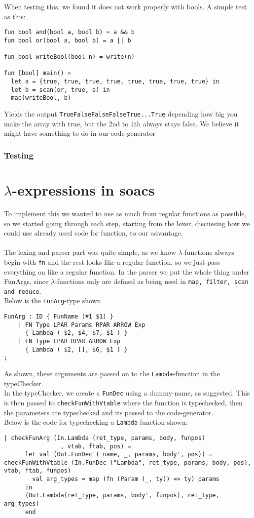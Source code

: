 \documentclass[paper=a4, fontsize=11pt]{scrartcl} %
\numberwithin{equation}{section} %
\numberwithin{figure}{section} %
\numberwithin{table}{section} %
\begin{document}
When testing this, we found it does not work properly with bools. A simple test as this:
\begin{lstlisting}
fun bool and(bool a, bool b) = a && b
fun bool or(bool a, bool b) = a || b

fun bool writeBool(bool n) = write(n)

fun [bool] main() =
  let a = {true, true, true, true, true, true, true, true} in
  let b = scan(or, true, a) in
  map(writeBool, b)
\end{lstlisting}
 Yields the output \verb"TrueFalseFalseFalseTrue...True" depending how big you make the array with true, but the 2nd to 4th always stays false. We believe it might have something to do in our code-generator
\subsubsection{Testing}

\section{$\lambda$-expressions in soacs}

To implement this we wanted to use as much from regular functions as possible, so we started going through each step, starting from the lexer, discussing how we could use already used code for function, to our advantage.\\\\
The lexing and parser part was quite simple, as we know $\lambda$-functions always begin with \verb"fn" and the rest looks like a regular function, so we just pass everything on like a regular function. In the parser we put the whole thing under FunArgs, since $\lambda$-functions only are defined as being used in \verb"map, filter, scan and reduce".\\
Below is the \verb"FunArg"-type shown
\begin{lstlisting}
FunArg : ID { FunName (#1 $1) }
    | FN Type LPAR Params RPAR ARROW Exp
      { Lambda ( $2, $4, $7, $1 ) }
    | FN Type LPAR RPAR ARROW Exp
      { Lambda ( $2, [], $6, $1 ) }
;
\end{lstlisting}

As shown, these arguments are passed on to the \verb"Lambda"-function in the typeChecker.\\
In the typeChecker, we create a \verb"FunDec" using a dummy-name, as suggested. This is then passed to \verb"checkFunWithVtable" where the function is typechecked, then the parameters are typechecked and its passed to the code-generator.\\
Below is the code for typechecking a \verb"Lambda"-function shown:
\begin{lstlisting}
| checkFunArg (In.Lambda (ret_type, params, body, funpos)
                , vtab, ftab, pos) = 
      let val (Out.FunDec ( name, _, params, body', pos)) = checkFunWithVtable (In.FunDec ("Lambda", ret_type, params, body, pos), vtab, ftab, funpos)
        val arg_types = map (fn (Param (_, ty)) => ty) params
      in  
      (Out.Lambda(ret_type, params, body', funpos), ret_type, arg_types)
      end
\end{lstlisting}
\end{document}
